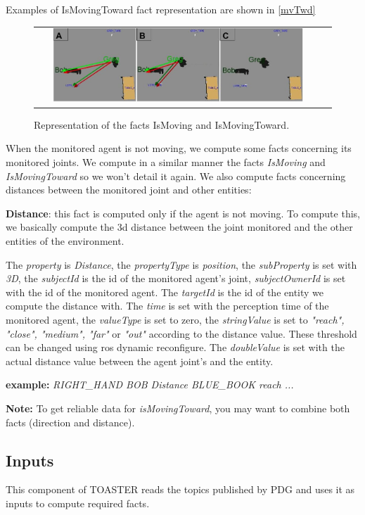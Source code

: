 \documentclass[a4paper]{article}
\begin{document}
Examples of IsMovingToward fact representation are shown in \ref{mvTwd}


 \begin{figure}[ht!]
 \centering
 \begin{tabular}{cc}
  \includegraphics[width=0.90\textwidth]{img/movingToward.jpg}
 \end{tabular}
 \caption{Representation of the facts IsMoving and IsMovingToward.}
 \label{fig:mvTwd}
 \end{figure}

When the monitored agent is not moving, we compute some facts concerning its monitored joints.
We compute in a similar manner the facts \textit{IsMoving} and \textit{IsMovingToward} so we won't detail it again.
We also compute facts concerning distances between the monitored joint and other entities:

 \textbf{Distance}: this fact is computed only if the agent is not moving.
To compute this, we basically compute the 3d distance between the joint monitored and the other entities of the environment.

The \textit{property} is \textit{Distance}, the \textit{propertyType} is \textit{position}, the \textit{subProperty} is set with \textit{3D}, the \textit{subjectId} is the id of the monitored agent's joint, \textit{subjectOwnerId} is set with the id of the monitored agent. The \textit{targetId} is the id of the entity we compute the distance with. The \textit{time} is set with the perception time of the monitored agent, the \textit{valueType} is set to zero, the \textit{stringValue} is set to \textit{"reach", "close", "medium", "far"} or \textit{"out"} according to the distance value. These threshold can be changed using ros dynamic reconfigure. The \textit{doubleValue} is set with the actual distance value between the agent joint's and the entity.

\textbf{example:} \textit{RIGHT\_HAND BOB Distance BLUE\_BOOK reach  ...}


\textbf{Note:} To get reliable data for \textit{isMovingToward}, you may want to combine both facts (direction and distance).
 
\subsection{Inputs}
This component of TOASTER reads the topics published by PDG and uses it as inputs to compute required facts.
\end{document}
